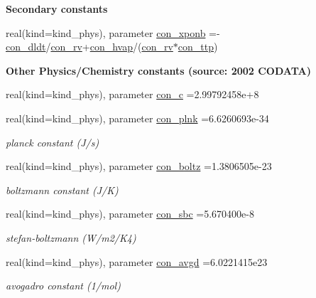 \begin{Indent}{\bf Secondary constants}
\begin{DoxyCompactItemize}
\item 
real(kind=kind\+\_\+phys), parameter \hyperlink{namespacephyscons_aa6b24a26902b52f4907f6419ebe3679a}{con\+\_\+xponb} =-\/\hyperlink{namespacephyscons_a04a189b8dc4814d5d519b4b92ec0cf31}{con\+\_\+dldt}/\hyperlink{namespacephyscons_a3ae962da4c7a9cb83c4a2abe743696b0}{con\+\_\+rv}+\hyperlink{namespacephyscons_a65ec8e424f61ccfe8520bf7cc5c070f8}{con\+\_\+hvap}/(\hyperlink{namespacephyscons_a3ae962da4c7a9cb83c4a2abe743696b0}{con\+\_\+rv}$\ast$\hyperlink{namespacephyscons_aa50af91a0e1d09edce2d2e6c4d7afc86}{con\+\_\+ttp})
\end{DoxyCompactItemize}
\end{Indent}
\begin{Indent}{\bf Other Physics/\+Chemistry constants (source\+: 2002 C\+O\+D\+A\+TA)}\par
\begin{DoxyCompactItemize}
\item 
real(kind=kind\+\_\+phys), parameter \hyperlink{namespacephyscons_a5ea39e1c39e8ae07b8e76586452a9279}{con\+\_\+c} =2.\+99792458e+8
\item 
real(kind=kind\+\_\+phys), parameter \hyperlink{namespacephyscons_ac94d6814305be7f718a971f96ccb9f3f}{con\+\_\+plnk} =6.\+6260693e-\/34
\begin{DoxyCompactList}\small\item\em planck constant (J/s) \end{DoxyCompactList}\item 
real(kind=kind\+\_\+phys), parameter \hyperlink{namespacephyscons_a9c7c365685bc2319763e5bbe1300b852}{con\+\_\+boltz} =1.\+3806505e-\/23
\begin{DoxyCompactList}\small\item\em boltzmann constant (J/K) \end{DoxyCompactList}\item 
real(kind=kind\+\_\+phys), parameter \hyperlink{namespacephyscons_ad90a38d35e6d071f7679f6c0a6f6aee1}{con\+\_\+sbc} =5.\+670400e-\/8
\begin{DoxyCompactList}\small\item\em stefan-\/boltzmann (W/m2/\+K4) \end{DoxyCompactList}\item 
real(kind=kind\+\_\+phys), parameter \hyperlink{namespacephyscons_ab54a93783404e24a0392dac0e0efa6b5}{con\+\_\+avgd} =6.\+0221415e23
\begin{DoxyCompactList}\small\item\em avogadro constant (1/mol) \end{DoxyCompactList}\item 

\end{DoxyCompactItemize}
\end{Indent}
